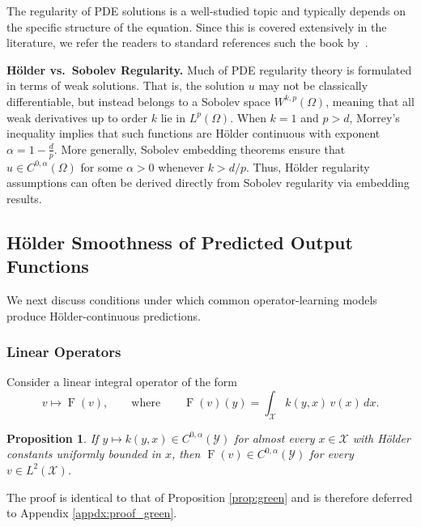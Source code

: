 \documentclass[11pt]{article}
\theoremstyle{plain}
\newtheorem{proposition}{Proposition}
\newcommand{\Xcal}{\mathcal{X}}
\newcommand{\Ycal}{\mathcal{Y}}
\begin{document}
The regularity of PDE solutions is a well-studied topic and typically depends on the specific structure of the equation. Since this is covered extensively in the literature, we refer the readers to standard references such the book by~\cite{evans2022partial}.



\vspace{0.3cm}

\noindent \textbf{H\"older vs.\ Sobolev Regularity.}
Much of PDE regularity theory is formulated in terms of weak solutions. That is, the solution $u$ may not be classically differentiable, but instead belongs to a Sobolev space $W^{k,p}(\Omega)$, meaning that all weak derivatives up to order $k$ lie in $L^p(\Omega)$.  When $k = 1$ and $p > d$, Morrey’s inequality \citep[Section~5.6.2]{evans2022partial} implies that such functions are H\"older continuous with exponent $\alpha = 1 - \frac{d}{p}$. More generally, Sobolev embedding theorems \citep[Section~5.6.3]{evans2022partial} ensure that $u \in C^{0,\alpha}(\Omega)$ for some $\alpha > 0$ whenever $k > d/p$. Thus, H\"older regularity assumptions can often be derived directly from Sobolev regularity via embedding results.



\subsection{H{\" o}lder Smoothness of Predicted Output Functions}

We next discuss conditions under which common operator-learning models produce
Hölder-continuous predictions.

\subsubsection{Linear Operators}

Consider a linear integral operator of the form
\[
v \mapsto \operatorname{F}(v),
\qquad
\text{where}
\qquad
\operatorname{F}(v)(y) = \int_{\Xcal} k(y,x)\, v(x)\, dx.
\]

\begin{proposition}
\label{prop:linear}
If $y \mapsto k(y,x) \in C^{0,\alpha}(\Ycal)$ for almost every $x \in \Xcal$ with Hölder constants
uniformly bounded in $x$, then $\operatorname{F}(v) \in C^{0,\alpha}(\Ycal)$ for every
$v \in L^2(\Xcal)$.
\end{proposition}

\noindent
The proof is identical to that of Proposition \ref{prop:green} and is therefore deferred to
Appendix \ref{appdx:proof_green}.
\end{document}
